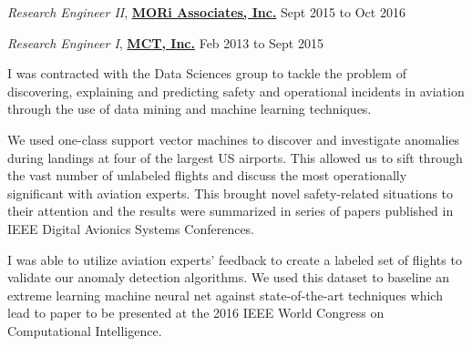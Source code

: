 \documentclass[10pt]{article}
\newenvironment{outerlist}[1][\enskip$\circ$]%
        {\begin{itemize}[#1]}{\end{itemize}%
         \vspace{-.6\baselineskip}}
\newenvironment{innerlist}[1][\enskip$\circ$]%
        {\begin{compactitem}[#1]}{\end{compactitem}}
\begin{document}
\begin{outerlist}
\item[] \textit{Research Engineer II}, \href{http://www.moriassociates.com/}{\textbf{MORi Associates, Inc.}} %
\hfill{Sept 2015 to Oct 2016}
\item[]\textit{Research Engineer I}, \href{http://www.mctinc.com/}{\textbf{MCT, Inc.}}%
  \hfill{Feb 2013 to Sept 2015}
  \begin{innerlist}
    \item I was contracted with the Data Sciences group to tackle the problem of discovering, explaining and predicting safety and operational incidents in aviation through the use of data mining and machine learning techniques.
    \item We used one-class support vector machines to discover and investigate anomalies during landings at four of the largest US airports. This allowed us to sift through the vast number of unlabeled flights and discuss the most operationally significant with aviation experts. This brought novel safety-related situations to their attention and the results were summarized in series of papers published in IEEE Digital Avionics Systems Conferences. 
    \item I was able to utilize aviation experts' feedback to create a labeled set of flights to validate our anomaly detection algorithms. We used this dataset to baseline an extreme learning machine neural net against state-of-the-art techniques which lead to paper to be presented at the 2016 IEEE World Congress on Computational Intelligence.


\end{innerlist}
\end{outerlist}
\end{document}
